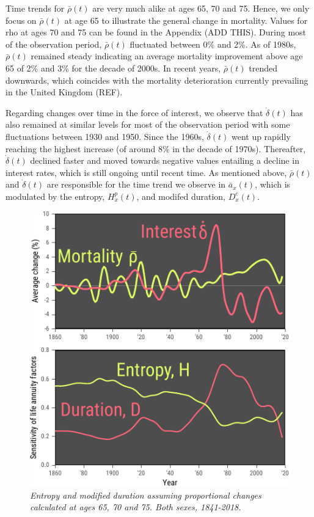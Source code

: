 \documentclass[12pt]{article}
\begin{document}
Time trends for $\bar{\rho}(t)$ are very much alike at ages 65, 70 and 75. Hence, we only focus on $\bar{\rho}(t)$ at age 65 to illustrate the general change in mortality. Values for rho at ages 70 and 75 can be found in the Appendix (ADD THIS). During most of the observation period, $\bar{\rho}(t)$ fluctuated between 0\% and 2\%. As of 1980s, $\bar{\rho}(t)$ remained steady indicating an average mortality improvement above age 65 of 2\% and 3\% for the decade of 2000s. In recent years, $\bar{\rho}(t)$ trended downwards, which coincides with the mortality deterioration currently prevailing in the United Kingdom (REF). 

Regarding changes over time in the force of interest, we observe that $\dot{\delta}(t)$ has also remained at similar levels for most of the observation period with some fluctuations between 1930 and 1950. Since the 1960s, $\dot{\delta}(t)$ went up rapidly reaching the highest increase (of around 8\% in the decade of 1970s). Thereafter, $\dot{\delta}(t)$ declined faster and moved towards negative values entailing a decline in interest rates, which is still ongoing until recent time. As mentioned above, $\bar{\rho}(t)$ and $\dot{\delta}(t)$ are responsible for the time trend we observe in $\bar{a}_x(t)$, which is modulated by the entropy, ${H}^{p}_x(t)$, and modifed duration, ${D}^{c}_x(t)$.



\begin{figure}[!ht]
	\centering
	\includegraphics[width=1\textwidth]{Fig/Fig3}
	\caption{\textit{Entropy and modified duration assuming proportional changes calculated at ages 65, 70 and 75. Both sexes, 1841-2018.}}
	\label{fig:Fig3}
\end{figure}
\end{document}
